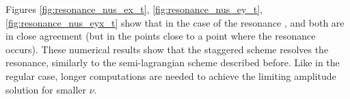 Figures \ref{fig:resonance_nus_ex_t}, \ref{fig:resonance_nus_ey_t}, \ref{fig:resonance_nus_eyx_t} show that in the case of the resonance
, and both  are in close agreement (but in the points close to a point where the resonance occurs).
These numerical results show that the staggered scheme resolves the resonance, similarly to the semi-lagrangian scheme described before.  
Like in the regular case, 
longer computations are needed to achieve the limiting amplitude solution  
for smaller $\nu$.

